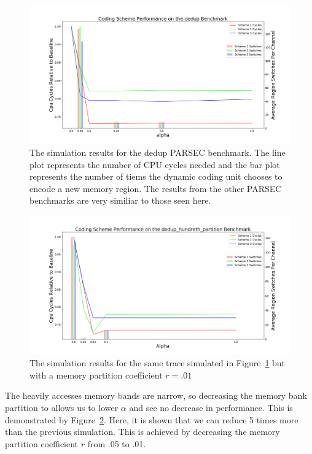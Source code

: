 \begin{figure}[htbp]
		\includegraphics[width=\linewidth]{fig/dedup_benchmark_results.png}
		\caption{The simulation results for the dedup PARSEC benchmark. The line plot represents the number of CPU cycles needed and the bar plot represents the number of tiems the dynamic coding unit chooses to encode a new memory region. The results from the other PARSEC benchmarks are very similiar to those seen here.}
		\label{fig:dedup_results}
\end{figure}
\begin{figure}[htbp]
		\includegraphics[width=\linewidth]{fig/dedup_hundreth.png}
		\caption{The simulation results for the same trace simulated in Figure~\ref{fig:dedup_results} but with a memory partition coefficient $r = .01$}
		\label{fig:dedup_hundreth}
\end{figure}

The heavily accesses memory bands are narrow, so decreasing the memory bank partition to allows us to lower $\alpha$ and see no decrease in performance. This is demonstrated by Figure~\ref{fig:dedup_hundreth}. Here, it is shown that we can reduce 5 times more than the previous simulation. This is achieved by decreasing the memory partition coefficient $r$ from .05 to .01.



